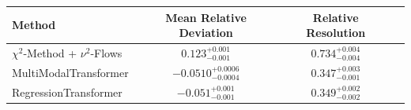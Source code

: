     \begin{tabular}{lccc}
        \toprule
        Method & Mean Relative Deviation & Relative Resolution \\
        \midrule
        $\chi^2$-Method + $\nu^2$-Flows & $0.123_{-0.001}^{+0.001}$ & $0.734_{-0.004}^{+0.004}$ \\
        MultiModalTransformer & $-0.0510_{-0.0004}^{+0.0006}$ & $0.347_{-0.001}^{+0.003}$ \\
        RegressionTransformer & $-0.051_{-0.001}^{+0.001}$ & $0.349_{-0.002}^{+0.002}$ \\
        \bottomrule
    \end{tabular}